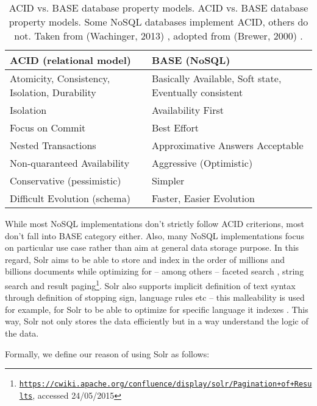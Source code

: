 \begin{table}[htbp]
\caption{ACID vs. BASE database property models. ACID vs. BASE database property models. Some NoSQL databases implement ACID, others do not. Taken from (Wachinger, 2013) \citep{wachinger2013next}, adopted from (Brewer, 2000) \citep{brewer2000towards}.}
\begin{tabularx}{\textwidth}{ | l | X | }
  \hline
  ACID (relational model) & BASE (NoSQL) \\
  \hline
  Atomicity, Consistency, Isolation, Durability & Basically Available, Soft state, Eventually consistent \\
  Isolation & Availability First \\
  Focus on Commit & Best Effort \\
  Nested Transactions & Approximative Answers Acceptable \\
  Non-quaranteed Availability & Aggressive (Optimistic) \\
  Conservative (pessimistic) & Simpler \\
  Difficult Evolution (schema) & Faster, Easier Evolution \\
  \hline
\end{tabularx}
  \label{fig:ACIDvsBASE}
\end{table}

While most NoSQL implementations don't strictly follow ACID criterions, most don't fall into BASE category either. Also, many NoSQL implementations focus on particular use case rather than aim at general data storage purpose. In this regard, Solr aims to be able to store and index in the order of millions and billions documents while optimizing for -- among others -- faceted search \citep{tunkelang2009faceted}, string search and result paging\footnote{\href{https://cwiki.apache.org/confluence/display/solr/Pagination+of+Results}{\texttt{https://cwiki.apache.org/confluence/display/solr/Pagination+of+Results}}, accessed 24/05/2015}. Solr also supports implicit definition of text syntax through definition of stopping sign, language rules etc -- this malleability is used for example, for Solr to be able to optimize for specific language it indexes \citep{grainger2014solr}. This way, Solr not only stores the data efficiently but in a way understand the logic of the data.

Formally, we define our reason of using Solr as follows:

